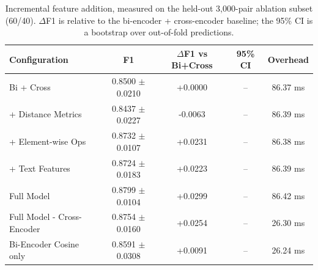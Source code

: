 \begin{table}[htbp]
\centering
\caption{Incremental feature addition, measured on the held-out 3,000-pair ablation subset (60/40). $\Delta$F1 is relative to the bi-encoder + cross-encoder baseline; the 95\% CI is a bootstrap over out-of-fold predictions.}
\label{tab:ablation_incremental}
\begin{tabular}{lcccc}
\toprule
\textbf{Configuration} & \textbf{F1} & \textbf{$\Delta$F1 vs Bi+Cross} & \textbf{95\% CI} & \textbf{Overhead} \\
\midrule
Bi + Cross & 0.8500 $\pm$ 0.0210 & +0.0000 & -- & 86.37 ms \\
+ Distance Metrics & 0.8437 $\pm$ 0.0227 & -0.0063 & -- & 86.39 ms \\
+ Element-wise Ops & 0.8732 $\pm$ 0.0107 & +0.0231 & -- & 86.38 ms \\
+ Text Features & 0.8724 $\pm$ 0.0183 & +0.0223 & -- & 86.39 ms \\
Full Model & 0.8799 $\pm$ 0.0104 & +0.0299 & -- & 86.42 ms \\
Full Model - Cross-Encoder & 0.8754 $\pm$ 0.0160 & +0.0254 & -- & 26.30 ms \\
Bi-Encoder Cosine only & 0.8591 $\pm$ 0.0308 & +0.0091 & -- & 26.24 ms \\
\bottomrule
\end{tabular}
\end{table}
